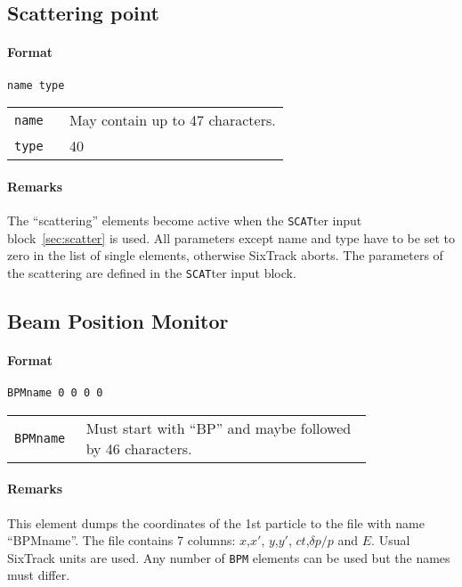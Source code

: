 \subsection{Scattering point} \label{SCAT}

\paragraph{Format} \texttt{name type}

\bigskip
\begin{tabular}{@{}lp{0.8\linewidth}}
    \texttt{name} & May contain up to 47 characters. \\
    \texttt{type} & 40
\end{tabular}

\paragraph{Remarks}
The ``scattering'' elements become active when the \texttt{SCAT}ter input block~\ref{sec:scatter} is used.
All parameters except name and type have to be set to zero in the list of single elements, otherwise SixTrack aborts.
The parameters of the scattering are defined in the \texttt{SCAT}ter input block.

\subsection{Beam Position Monitor} \label{BPM}

\paragraph{Format} \texttt{BPMname 0 0 0 0}

\bigskip
\begin{tabular}{@{}lp{0.8\linewidth}}
    \texttt{BPMname} & Must start with ``BP'' and maybe followed by 46 characters.
\end{tabular}

\paragraph{Remarks}
This element dumps the coordinates of the 1st particle to the file with name ``BPMname''.
The file contains 7 columns: $x$,$x'$, $y$,$y'$, $ct$,$\delta p/p$ and $E$.
Usual SixTrack units are used.
Any number of \texttt{BPM} elements can be used but the names must differ.


